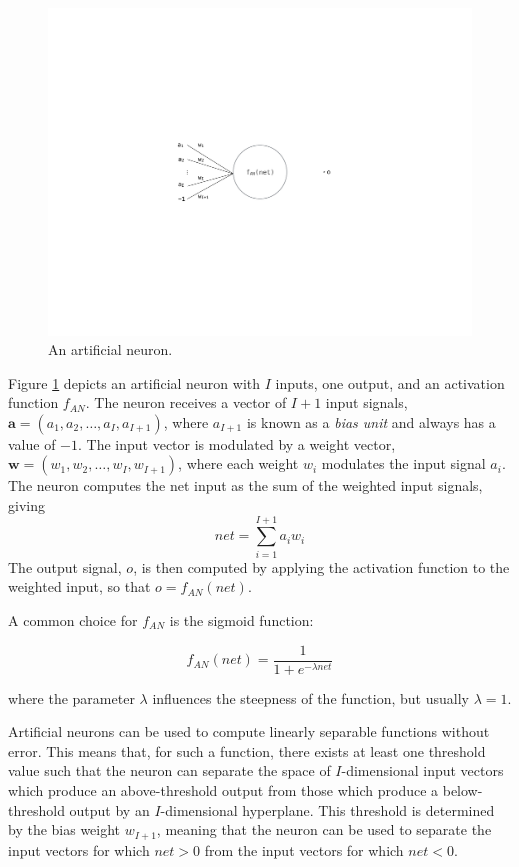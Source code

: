 \documentclass[master]{outhesis}
\begin{document}
\begin{figure}[H]
	\centering
	\includegraphics[scale=0.1]{ArtificialNeuron.pdf}
	\caption{An artificial neuron.}
	\label{fig:neuron}
\end{figure}

Figure \ref{fig:neuron} depicts an artificial neuron with $I$ inputs, one output, and an activation function $f_{AN}$. The neuron receives a vector of $I+1$ input signals, $\mathbf{a}=(a_1, a_2, \ldots, a_I, a_{I+1})$, where $a_{I+1}$ is known as a \emph{bias unit} and always has a value of $-1$.  The input vector is modulated by a weight vector, $\mathbf{w}=(w_1, w_2, \ldots, w_I, w_{I+1})$, where each weight $w_i$ modulates the input signal $a_i$. The neuron computes the net input as the sum of the weighted input signals, giving
\begin{equation}
net=\sum_{i=1}^{I+1}a_iw_i
\end{equation}
The output signal, $o$, is then computed by applying the activation function to the weighted input, so that $o=f_{AN}(net)$.

A common choice for $f_{AN}$ is the sigmoid function:

\begin{equation}
f_{AN}(net) = \frac{1}{1 + e^{-\lambda net}}
\end{equation}

where the parameter $\lambda$ influences the steepness of the function, but usually $\lambda = 1$.

Artificial neurons can be used to compute linearly separable functions without error. This means that, for such a function, there exists at least one threshold value such that the neuron can separate the space of $I$-dimensional input vectors which produce an above-threshold output from those which produce a below-threshold output by an $I$-dimensional hyperplane. This threshold is determined by the bias weight $w_{I+1}$, meaning that the neuron can be used to separate the input vectors for which $net > 0$ from the input vectors for which $net < 0$.
\end{document}
